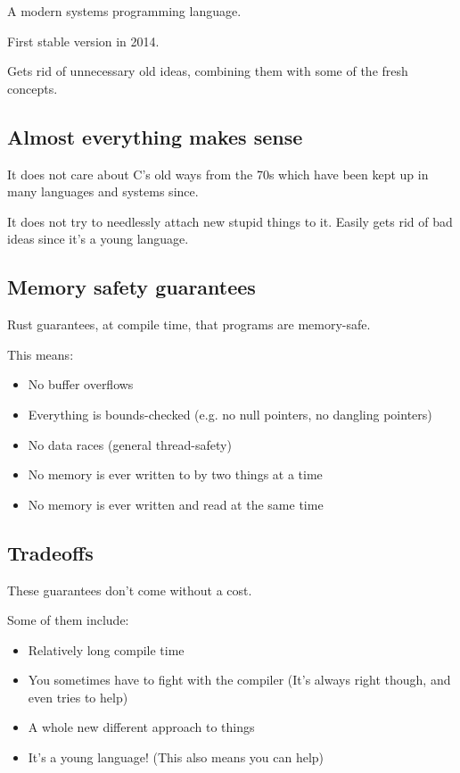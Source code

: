\documentclass[usenames,twocolumn,dvipsnames,10pt,a4wide]{article}
\begin{document}
A modern systems programming language.



First stable version in 2014.



Gets rid of unnecessary old ideas, combining 
them with some of the fresh concepts.


\subsection{Almost everything makes sense} 

It does not care about C’s old ways 
from the 70s which have been kept up 
in many languages and systems since. 


It does not try to needlessly attach new 
stupid things to it. Easily gets rid of bad 
ideas since it’s a young language.


\subsection{Memory safety guarantees}
Rust guarantees, at compile time, that
programs are memory-safe.



This means:
\begin{itemize}[label=$\bullet$]
	\item No buffer overflows
	\item Everything is bounds-checked (e.g. no null pointers, no dangling pointers)
	\item No data races (general thread-safety)
	\item No memory is ever written to by two things at a time
	\item No memory is ever written and read at the same time
\end{itemize}


\subsection{Tradeoffs}
These guarantees don't
come without a cost.



Some of them include:
\begin{itemize}[label=$\bullet$]
	\item Relatively long compile time
	\item You sometimes have to fight with the compiler
		(It's always right though, and even tries to help)
	\item A whole new different approach to things
	\item It's a young language!
		(This also means you can help)
\end{itemize}
\end{document}
